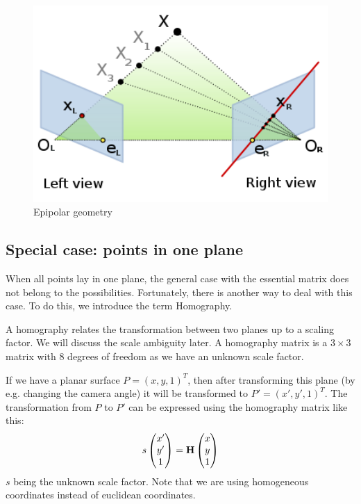 \begin{figure}
    \centering
    \includegraphics[width=1\textwidth]{figures/epipolar_geometry.png}
    \caption{Epipolar geometry}
    \label{fig:epigeo}
\end{figure}

\subsection{Special case: points in one plane}
When all points lay in one plane, the general case with the essential matrix does not belong to the possibilities. Fortunately, there is another way to deal with this case. To do this, we introduce the term Homography. \bigskip

A homography relates the transformation between two planes up to a scaling factor. We will discuss the scale ambiguity later. A homography matrix is a $3\times3$ matrix with 8 degrees of freedom as we have an unknown scale factor.\bigskip

If we have a planar surface $P = (x, y, 1)^T$, then after transforming this plane (by e.g. changing the camera angle) it will be transformed to $P' = (x', y', 1)^T$. The transformation from $P$ to $P'$ can be expressed using the homography matrix like this:
\begin{equation}
    s\begin{pmatrix}
        x' \\ y' \\ 1
    \end{pmatrix} = \mathbf{H} \begin{pmatrix}
        x \\ y \\ 1
    \end{pmatrix}
\end{equation}
$s$ being the unknown scale factor. Note that we are using homogeneous coordinates instead of euclidean coordinates.\bigskip

